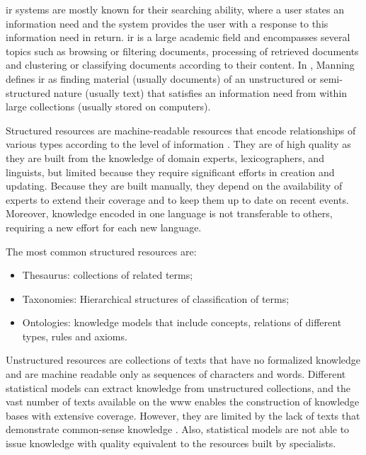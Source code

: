 \gls{ir} systems are mostly known for their searching ability, where a user states an information need and the system provides the user with a response to this information need in return. \gls{ir} is a large academic field and encompasses several topics such as browsing or filtering documents, processing of retrieved documents and clustering or classifying documents according to their content. In \cite{Manning:2008}, Manning defines \gls{ir} as finding material (usually documents) of an unstructured or semi-structured nature (usually text) that satisfies an information need from within large collections (usually stored on computers).

Structured resources are machine-readable resources that encode relationships of various types according to the level of information \cite{hovy2013collaboratively}. They are of high quality as they are built from the knowledge of domain experts, lexicographers, and linguists, but limited because they require significant efforts in creation and updating. Because they are built manually, they depend on the availability of experts to extend their coverage and to keep them up to date on recent events. Moreover, knowledge encoded in one language is not transferable to others, requiring a new effort for each new language.

The most common structured resources are:

\begin{itemize}

\item Thesaurus: collections of related terms;
\item Taxonomies: Hierarchical structures of classification of terms;
\item Ontologies: knowledge models that include concepts, relations of different types, rules and axioms.
\end{itemize}

Unstructured resources are collections of texts that have no formalized knowledge and are machine readable only as sequences of characters and words. Different statistical models can extract knowledge from unstructured collections, and the vast number of texts available on the \gls{www} enables the construction of knowledge bases with extensive coverage. However, they are limited by the lack of texts that demonstrate common-sense knowledge \cite{hovy2013collaboratively}. Also, statistical models are not able to issue knowledge with quality equivalent to the resources built by specialists.

